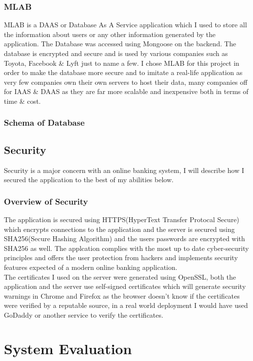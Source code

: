 \subsection{MLAB}
MLAB is a DAAS or Database As A Service application which I used to store all the information about users or any other information
generated by the application.  The Database was accessed using Mongoose on the backend.  The database is encrypted and secure and is used by
various companies such as Toyota, Facebook \& Lyft just to name a few.  I chose MLAB for this project in order to make the database more secure
and to imitate a real-life application as very few companies own their own servers to host their data, many companies off for IAAS \& DAAS as they are far more scalable and inexpensive both in terms of time \& cost.
\subsection{Schema of Database}
\section{Security}
Security is a major concern with an online banking system, I will describe how I secured the application to the best of my abilities below.
\subsection{Overview of Security}
The application is secured using HTTPS(HyperText Transfer Protocal Secure) which encrypts connections to the application and the server
is secured using SHA256(Secure Hashing Algorithm) and the users passwords are encrypted with SHA256 as well.  The applcation complies with the most up to date cyber-security principles and offers the user protection from hackers and implements security features expected of a modern online banking application.
\\
The certificates I used on the server were generated using OpenSSL, both the application and the server use self-signed certificates which will generate security warnings in Chrome and Firefox as the browser doesn't know if the certificates were verified by a reputable source, in a real world deployment I would have used GoDaddy or another service to verify the certificates.
\chapter{System Evaluation}
